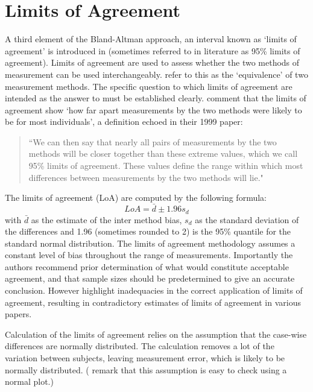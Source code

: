 \documentclass[12pt, a4paper]{report}
\theoremstyle{plain}
\theoremstyle{definition}
\theoremstyle{remark}
\begin{document}
	
	


	
	\section{Limits of Agreement}
	A third element of the Bland-Altman approach, an interval known
	as `limits of agreement' is introduced in \citet*{BA86}
	(sometimes referred to in literature as 95\% limits of agreement).
	Limits of agreement are used to assess whether the two methods of
	measurement can be used interchangeably. \citet{BA86} refer to
	this as the `equivalence' of two measurement methods. The specific question to which limits of
	agreement are intended as the answer to must be
	established clearly. \citet*{BA95} comment that the limits of agreement show `how
	far apart measurements by the two methods were likely to be for
	most individuals', a definition echoed in their 1999 paper:
	
	\begin{quote}``We can then say that nearly all pairs
		of measurements by the two methods will be closer together than
		these extreme values, which we call 95\% limits of agreement.
		These values define the range within which most differences
		between measurements by the two methods will lie."
	\end{quote}
	
	The limits of agreement (LoA) are computed by the following
	formula:
	\[
	LoA = \bar{d} \pm 1.96 s_{d}
	\]
	with $\bar{d}$ as the estimate of the inter method bias, $s_{d}$
	as the standard deviation of the differences and 1.96 (sometimes rounded to 2) is the 95\%
	quantile for the standard normal distribution. The limits of agreement methodology assumes a constant level of bias throughout the range of measurements. Importantly the authors recommend prior determination of what would constitute acceptable
	agreement, and that sample sizes should be predetermined to give an accurate conclusion. However \citet{mantha} highlight inadequacies in the correct application of limits of agreement, resulting in contradictory estimates of limits of agreement in various papers.
	
	Calculation of the limits of agreement relies on the assumption that the case-wise differences are normally distributed.
	The calculation removes a lot of the variation between subjects,  leaving measurement error, which is likely to be normally distributed. (\citet{BA99} remark that this assumption is easy to check using a normal plot.)
	
\end{document}
